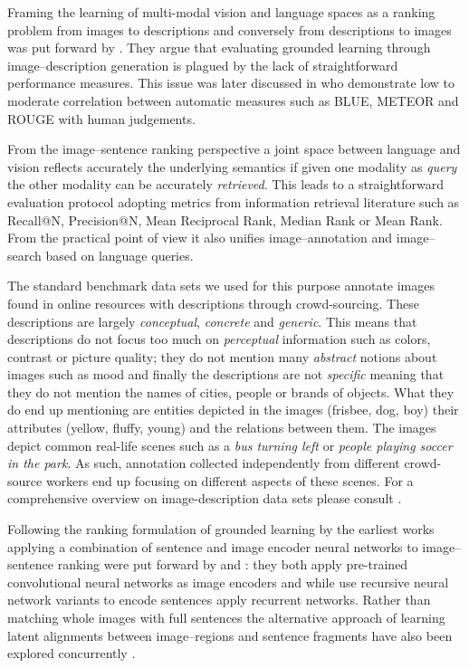 Framing the learning of multi-modal vision and language spaces as a ranking problem
from images to descriptions and conversely from descriptions to images was
put forward by \cite{hodosh2013framing}.
They argue that evaluating grounded learning through image--description generation
is plagued by the lack of straightforward performance measures.
This issue was later discussed in \cite{elliott2014comparing} who demonstrate low to moderate correlation
between automatic measures such as BLUE, METEOR and ROUGE with human judgements.

From the image--sentence ranking perspective  a joint space between
language and vision reflects accurately
the underlying semantics if given one modality as \emph{query} the other modality
can be accurately \emph{retrieved}.  This leads to a straightforward evaluation protocol
adopting metrics from information retrieval literature such as Recall@N, Precision@N, Mean Reciprocal
Rank, Median Rank or Mean Rank. From the practical point of view it also unifies image--annotation
and image--search based on language queries.

The standard benchmark data sets  we used for this purpose
annotate images found in online resources with descriptions through crowd-sourcing.
These descriptions are largely \emph{conceptual}, \emph{concrete}
and \emph{generic}.
This means that descriptions do not focus too much on \emph{perceptual}
information such as colors, contrast or picture quality; they do not mention
many \emph{abstract} notions about images such as mood and finally the descriptions
are not \emph{specific} meaning that they do not mention the names of cities,
people or brands of objects.
What they do end up mentioning are entities depicted in the images
(frisbee, dog, boy) their attributes (yellow, fluffy, young) and the
relations between them.
The images depict common real-life scenes such as a \emph{bus turning left} or \emph{people
playing soccer in the park}. As such, annotation collected independently from
different crowd-source workers end up focusing on different aspects of
these scenes. For a comprehensive overview on image-description data sets
please consult \cite{bernardi2016automatic}.

Following the ranking formulation of grounded learning by \citep{hodosh2013framing}
the earliest works applying a combination of sentence and image encoder neural networks
to image--sentence ranking were put forward by \cite{kiros2014unifying} and \cite{socher2014grounded}:
they both apply pre-trained convolutional neural networks as image encoders and while
\cite{socher2014grounded} use recursive neural network variants to encode sentences
\cite{kiros2014unifying} apply recurrent networks. Rather than matching whole images with full
sentences the alternative approach of learning latent alignments between image--regions and
sentence fragments have also been explored concurrently \citep{karpathy2014deep,karpathy2015deep}.


